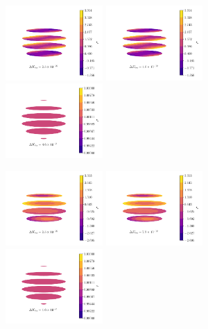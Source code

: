 \documentclass[fleqn,usenatbib]{mnras}
\begin{document}
\begin{figure}
  \centering
  \includegraphics[width=0.33\textwidth]{figs/asym-sph-likelihood.pdf}\hfill
  \includegraphics[width=0.33\textwidth]{figs/asym-sph-harmonic.pdf}\hfill
  \includegraphics[width=0.33\textwidth]{figs/asym-sph-lumpy.pdf}

  \includegraphics[width=0.33\textwidth]{figs/sym-sph-likelihood.pdf}\hfill
  \includegraphics[width=0.33\textwidth]{figs/sym-sph-harmonic.pdf}\hfill
  \includegraphics[width=0.33\textwidth]{figs/sym-sph-lumpy.pdf}\


\end{figure}
\end{document}
